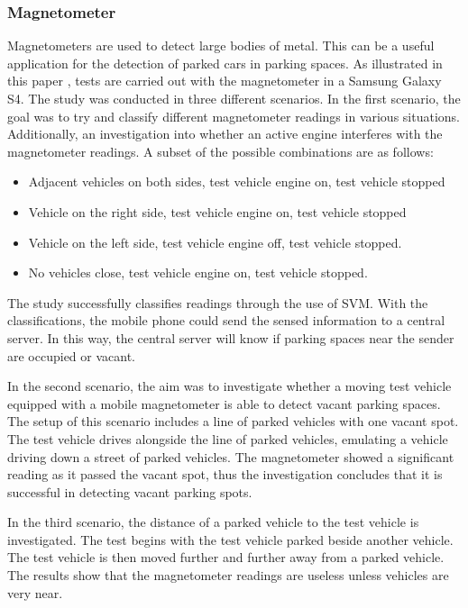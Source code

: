 \subsubsection*{Magnetometer}
Magnetometers are used to detect large bodies of metal. This can be a useful application for the detection of parked cars in parking spaces. As illustrated in this paper \citep{Villanueva2016CrowdsensingMonitoring}, tests are carried out with the magnetometer in a Samsung Galaxy S4. The study was conducted in three different scenarios. In the first scenario, the goal was to try and classify different magnetometer readings in various situations. Additionally, an investigation into whether an active engine interferes with the magnetometer readings. A subset of the possible combinations are as follows:

\begin{itemize}
    \item Adjacent vehicles on both sides, test vehicle engine on, test vehicle stopped
    \item Vehicle on the right side, test vehicle engine on, test vehicle stopped
    \item Vehicle on the left side, test vehicle engine off, test vehicle stopped.
    \item No vehicles close, test vehicle engine on, test vehicle stopped.
\end{itemize}

The study successfully classifies readings through the use of \ac{SVM}. With the classifications, the mobile phone could send the sensed information to a central server. In this way, the central server will know if parking spaces near the sender are occupied or vacant.

In the second scenario, the aim was to investigate whether a moving test vehicle equipped with a mobile magnetometer is able to detect vacant parking spaces. The setup of this scenario includes a line of parked vehicles with one vacant spot. The test vehicle drives alongside the line of parked vehicles, emulating a vehicle driving down a street of parked vehicles. The magnetometer showed a significant reading as it passed the vacant spot, thus the investigation concludes that it is successful in detecting vacant parking spots.

In the third scenario, the distance of a parked vehicle to the test vehicle is investigated. The test begins with the test vehicle parked beside another vehicle. The test vehicle is then moved further and further away from a parked vehicle. The results show that the magnetometer readings are useless unless vehicles are very near.